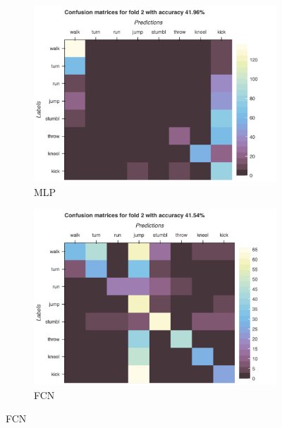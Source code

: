 		\begin{figure}[H]
			\centering
			\begin{subfigure}[b]{0.49\textwidth}
				\centering
				\includegraphics[width=\textwidth]{img/MLP-confusion_matrix.png}
				\caption{MLP}
			\end{subfigure}
			\hfill
			\begin{subfigure}[b]{0.49\textwidth}
				\centering
				\includegraphics[width=\textwidth]{img/FCN-confusion_matrix.png}
				\caption{FCN}
			\end{subfigure}
		\end{figure}
